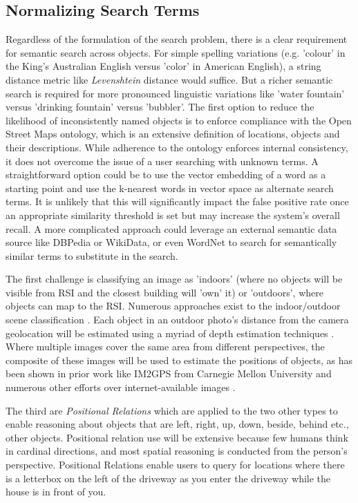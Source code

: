 \subsection{Normalizing Search Terms}  %
Regardless of the formulation of the search problem, there is a clear requirement for semantic search across objects. For simple spelling variations (e.g. 'colour' in the King's Australian English versus 'color' in American English), a string distance metric like \textit{Levenshtein} distance would suffice. 
But a richer semantic search is required for more pronounced linguistic variations like 'water fountain' versus 'drinking fountain' versus 'bubbler'. 
The first option to reduce the likelihood of inconsistently named objects is to enforce compliance with the Open Street Maps ontology, which is an extensive definition of locations, objects and their descriptions. 
While adherence to the ontology enforces internal consistency, it does not overcome the issue of a user searching with unknown terms. 
A straightforward option could be to use the vector embedding of a word as a starting point and use the k-nearest words in vector space as alternate search terms. 
It is unlikely that this will significantly impact the false positive rate once an appropriate similarity threshold is set but may increase the system's overall recall. 
A more complicated approach could leverage an external semantic data source like DBPedia or WikiData, or even WordNet to search for semantically similar terms to substitute in the search. 


The first challenge is classifying an image as 'indoors' (where no objects will be visible from RSI and the closest building will 'own' it) or 'outdoors', where objects can map to the RSI. Numerous approaches exist to the indoor/outdoor scene classification \cite{Tong2017}. 
Each object in an outdoor photo's distance from the camera geolocation will be estimated using a myriad of depth estimation techniques \cite{Ming2021,Liu2020}. 
Where multiple images cover the same area from different perspectives, the composite of these images will be used to estimate the positions of objects, as has been shown in prior work like IM2GPS from Carnegie Mellon University \cite{Hays2008} and numerous other efforts over internet-available images \cite{Snavely2011}. 


The third are \textit{Positional Relations} which are applied to the two other types to enable reasoning about objects that are left, right, up, down, beside, behind etc., other objects. 
Positional relation use will be extensive because few humans think in cardinal directions, and most spatial reasoning is conducted from the person's perspective. 
Positional Relations enable users to query for locations where there is a letterbox on the left of the driveway as you enter the driveway while the house is in front of you. 

